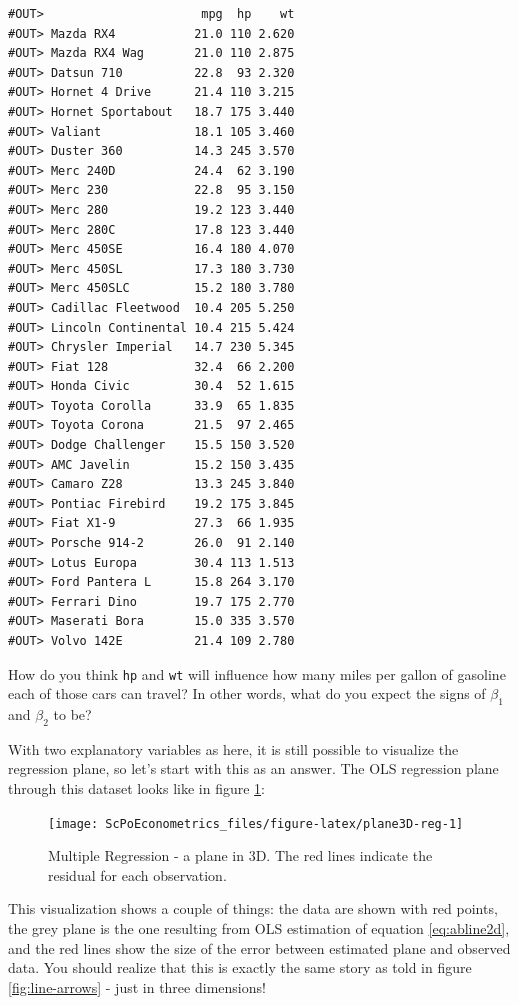 \documentclass[]{book}
\theoremstyle{definition}
\theoremstyle{definition}
\theoremstyle{definition}
\theoremstyle{remark}
\begin{document}
\begin{verbatim}
#OUT>                      mpg  hp    wt
#OUT> Mazda RX4           21.0 110 2.620
#OUT> Mazda RX4 Wag       21.0 110 2.875
#OUT> Datsun 710          22.8  93 2.320
#OUT> Hornet 4 Drive      21.4 110 3.215
#OUT> Hornet Sportabout   18.7 175 3.440
#OUT> Valiant             18.1 105 3.460
#OUT> Duster 360          14.3 245 3.570
#OUT> Merc 240D           24.4  62 3.190
#OUT> Merc 230            22.8  95 3.150
#OUT> Merc 280            19.2 123 3.440
#OUT> Merc 280C           17.8 123 3.440
#OUT> Merc 450SE          16.4 180 4.070
#OUT> Merc 450SL          17.3 180 3.730
#OUT> Merc 450SLC         15.2 180 3.780
#OUT> Cadillac Fleetwood  10.4 205 5.250
#OUT> Lincoln Continental 10.4 215 5.424
#OUT> Chrysler Imperial   14.7 230 5.345
#OUT> Fiat 128            32.4  66 2.200
#OUT> Honda Civic         30.4  52 1.615
#OUT> Toyota Corolla      33.9  65 1.835
#OUT> Toyota Corona       21.5  97 2.465
#OUT> Dodge Challenger    15.5 150 3.520
#OUT> AMC Javelin         15.2 150 3.435
#OUT> Camaro Z28          13.3 245 3.840
#OUT> Pontiac Firebird    19.2 175 3.845
#OUT> Fiat X1-9           27.3  66 1.935
#OUT> Porsche 914-2       26.0  91 2.140
#OUT> Lotus Europa        30.4 113 1.513
#OUT> Ford Pantera L      15.8 264 3.170
#OUT> Ferrari Dino        19.7 175 2.770
#OUT> Maserati Bora       15.0 335 3.570
#OUT> Volvo 142E          21.4 109 2.780
\end{verbatim}

How do you think \texttt{hp} and \texttt{wt} will influence how many
miles per gallon of gasoline each of those cars can travel? In other
words, what do you expect the signs of \(\beta_1\) and \(\beta_2\) to
be?

With two explanatory variables as here, it is still possible to
visualize the regression plane, so let's start with this as an answer.
The OLS regression plane through this dataset looks like in figure
\ref{fig:plane3D-reg}:

\begin{figure}

{\centering \texttt{[image: ScPoEconometrics\_files/figure-latex/plane3D-reg-1]} 

}

\caption{Multiple Regression - a plane in 3D. The red lines indicate the residual for each observation.}\label{fig:plane3D-reg}
\end{figure}

This visualization shows a couple of things: the data are shown with red
points, the grey plane is the one resulting from OLS estimation of
equation \eqref{eq:abline2d}, and the red lines show the size of the error
between estimated plane and observed data. You should realize that this
is exactly the same story as told in figure \ref{fig:line-arrows} - just
in three dimensions!
\end{document}
